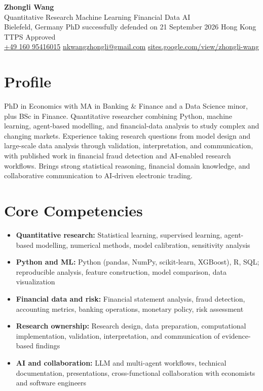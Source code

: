 \documentclass[a4paper,11pt]{article}
\begin{document}
\begin{center}
  {\LARGE\textbf{\textcolor{accent}{Zhongli Wang}}}\\[3pt]
  {\large Quantitative Research \textbar{} Machine Learning \textbar{} Financial Data \textbar{} AI}\\[3pt]
  Bielefeld, Germany \textbar{} PhD successfully defended on 21 September 2026 \textbar{} Hong Kong TTPS Approved \\[2pt]
  \href{tel:+4916095416015}{+49 160 95416015} \textbar{}
  \href{mailto:nkwangzhongli@gmail.com}{nkwangzhongli@gmail.com} \textbar{}
  \href{https://sites.google.com/view/zhongli-wang/}{sites.google.com/view/zhongli-wang}
\end{center}

\section{Profile}
PhD in Economics with MA in Banking \& Finance and a Data Science minor, plus BSc in Finance. Quantitative researcher combining Python, machine learning, agent-based modelling, and financial-data analysis to study complex and changing markets. Experience taking research questions from model design and large-scale data analysis through validation, interpretation, and communication, with published work in financial fraud detection and AI-enabled research workflows. Brings strong statistical reasoning, financial domain knowledge, and collaborative communication to AI-driven electronic trading.

\section{Core Competencies}
\begin{itemize}
  \item \textbf{Quantitative research:} Statistical learning, supervised learning, agent-based modelling, numerical methods, model calibration, sensitivity analysis
  \item \textbf{Python and ML:} Python (pandas, NumPy, scikit-learn, XGBoost), R, SQL; reproducible analysis, feature construction, model comparison, data visualization
  \item \textbf{Financial data and risk:} Financial statement analysis, fraud detection, accounting metrics, banking operations, monetary policy, risk assessment
  \item \textbf{Research ownership:} Research design, data preparation, computational implementation, validation, interpretation, and communication of evidence-based findings
  \item \textbf{AI and collaboration:} LLM and multi-agent workflows, technical documentation, presentations, cross-functional collaboration with economists and software engineers
\end{itemize}
\end{document}
